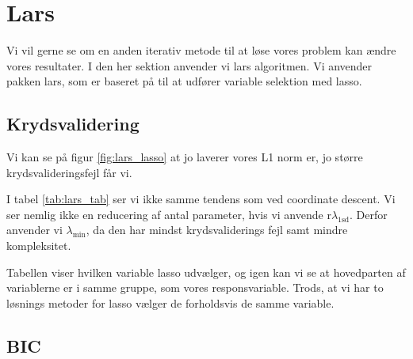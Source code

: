 \section{Lars}
Vi vil gerne se om en anden iterativ metode til at løse vores problem kan ændre vores resultater. 
I den her sektion anvender vi lars algoritmen. 
Vi anvender pakken lars, som er baseret på  \citep{lars} til at udfører variable selektion med lasso.
\subsection{Krydsvalidering}

Vi kan se på figur \ref{fig:lars_lasso} at jo laverer vores L1 norm er, jo større krydsvalideringsfejl får vi.  


I tabel \ref{tab:lars_tab} ser vi ikke samme tendens som ved coordinate descent. 
Vi ser nemlig ikke en reducering af antal parameter, hvis vi anvende r$\lambda_{1\text{sd}}$.
Derfor anvender vi $\lambda_{\min}$, da den har mindst krydsvaliderings fejl samt mindre kompleksitet. 





Tabellen viser hvilken variable lasso udvælger, og igen kan vi se at hovedparten af variablerne er i samme gruppe, som vores responsvariable. 
Trods, at vi har to løsnings metoder for lasso vælger de forholdsvis de samme variable.


\subsection{BIC}